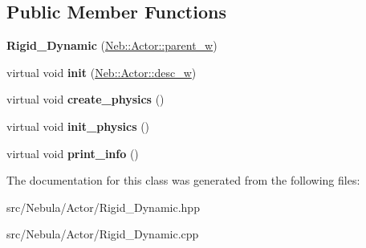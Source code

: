 \subsection*{\-Public \-Member \-Functions}
\begin{DoxyCompactItemize}
\item 
\hypertarget{classNeb_1_1Actor_1_1Rigid__Dynamic_a2e6a81583c34de2effef84f36d74d996}{{\bfseries \-Rigid\-\_\-\-Dynamic} (\hyperlink{classNeb_1_1weak__ptr}{\-Neb\-::\-Actor\-::parent\-\_\-w})}\label{classNeb_1_1Actor_1_1Rigid__Dynamic_a2e6a81583c34de2effef84f36d74d996}

\item 
\hypertarget{classNeb_1_1Actor_1_1Rigid__Dynamic_a2180b5ed21dbb42162126a0dc3bb3c36}{virtual void {\bfseries init} (\hyperlink{classNeb_1_1weak__ptr}{\-Neb\-::\-Actor\-::desc\-\_\-w})}\label{classNeb_1_1Actor_1_1Rigid__Dynamic_a2180b5ed21dbb42162126a0dc3bb3c36}

\item 
\hypertarget{classNeb_1_1Actor_1_1Rigid__Dynamic_a784a6718627cfa55994668c388c648e9}{virtual void {\bfseries create\-\_\-physics} ()}\label{classNeb_1_1Actor_1_1Rigid__Dynamic_a784a6718627cfa55994668c388c648e9}

\item 
\hypertarget{classNeb_1_1Actor_1_1Rigid__Dynamic_a25c3a55aa487167fbc7bc30078f3e03c}{virtual void {\bfseries init\-\_\-physics} ()}\label{classNeb_1_1Actor_1_1Rigid__Dynamic_a25c3a55aa487167fbc7bc30078f3e03c}

\item 
\hypertarget{classNeb_1_1Actor_1_1Rigid__Dynamic_a3f0eef890a878fb76d1572aa3a0c66ae}{virtual void {\bfseries print\-\_\-info} ()}\label{classNeb_1_1Actor_1_1Rigid__Dynamic_a3f0eef890a878fb76d1572aa3a0c66ae}

\end{DoxyCompactItemize}


\-The documentation for this class was generated from the following files\-:\begin{DoxyCompactItemize}
\item 
src/\-Nebula/\-Actor/\-Rigid\-\_\-\-Dynamic.\-hpp\item 
src/\-Nebula/\-Actor/\-Rigid\-\_\-\-Dynamic.\-cpp\end{DoxyCompactItemize}
